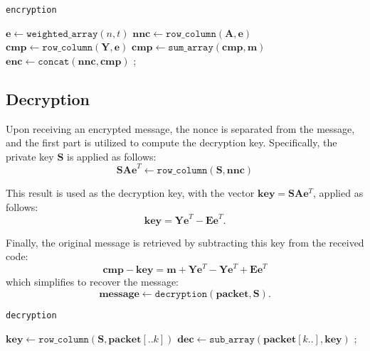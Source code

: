 \begin{algorithm}[H]
\caption{\texttt{encryption}}
\label{enc}

\DontPrintSemicolon
\SetStartEndCondition{ }{}{}
\AlgoDontDisplayBlockMarkers\SetAlgoNoEnd\SetAlgoNoLine

$\mathbf{e} \leftarrow \texttt{weighted\_array}(n, t)$\;
$\mathbf{nnc} \leftarrow \texttt{row\_column}(\mathbf{A}, \mathbf{e})$\;
$\mathbf{cmp} \leftarrow \texttt{row\_column}(\mathbf{Y}, \mathbf{e})$\;
$\mathbf{cmp} \leftarrow \texttt{sum\_array}(\mathbf{cmp}, \mathbf{m})$\;
$\mathbf{enc} \leftarrow \texttt{concat}(\mathbf{nnc}, \mathbf{cmp})$ 
;
\end{algorithm}

\subsection{Decryption}
Upon receiving an encrypted message, the nonce is separated from the message, and the first part is utilized to compute the decryption key. Specifically, the private key $\mathbf{S}$ is applied as follows:
\[
\mathbf{SAe}^T \leftarrow \texttt{row\_column}(\mathbf{S}, \mathbf{nnc})
\]

This result is used as the decryption key, with the vector $\mathbf{key} = \mathbf{SA}\mathbf{e}^T$, applied as follows: \[\mathbf{key} = \mathbf{Ye}^T - \mathbf{Ee}^T.\]

Finally, the original message is retrieved by subtracting this key from the received code:
\[
\mathbf{cmp} - \mathbf{key} = \mathbf{m} + \mathbf{Ye}^T - \mathbf{Ye}^T + \mathbf{Ee}^T
\]
which simplifies to recover the message:
\[
\mathbf{message} \leftarrow \texttt{decryption}(\mathbf{packet}, \mathbf{S}).
\]

\begin{algorithm}[H]
\caption{\texttt{decryption}}
\label{dec}

\DontPrintSemicolon
\SetStartEndCondition{ }{}{}
\AlgoDontDisplayBlockMarkers\SetAlgoNoEnd\SetAlgoNoLine

$\mathbf{key} \leftarrow \texttt{row\_column}(\mathbf{S}, \mathbf{packet}[..k])$ 
$\mathbf{dec} \leftarrow \texttt{sub\_array}(\mathbf{packet}[k..], \mathbf{key})$ 
;
\end{algorithm}

